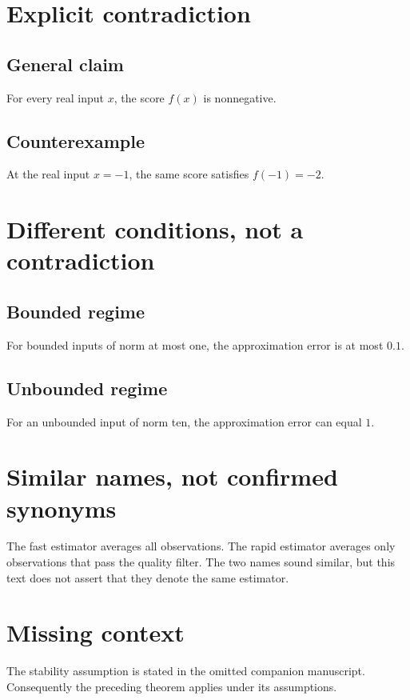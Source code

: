 \documentclass{article}
\begin{document}
\section{Explicit contradiction}
\subsection{General claim}
For every real input $x$, the score $f(x)$ is nonnegative.
\subsection{Counterexample}
At the real input $x=-1$, the same score satisfies $f(-1)=-2$.

\section{Different conditions, not a contradiction}
\subsection{Bounded regime}
For bounded inputs of norm at most one, the approximation error is at most $0.1$.
\subsection{Unbounded regime}
For an unbounded input of norm ten, the approximation error can equal $1$.

\section{Similar names, not confirmed synonyms}
The fast estimator averages all observations.
The rapid estimator averages only observations that pass the quality filter.
The two names sound similar, but this text does not assert that they denote the same estimator.

\section{Missing context}
The stability assumption is stated in the omitted companion manuscript.
Consequently the preceding theorem applies under its assumptions.
\end{document}
